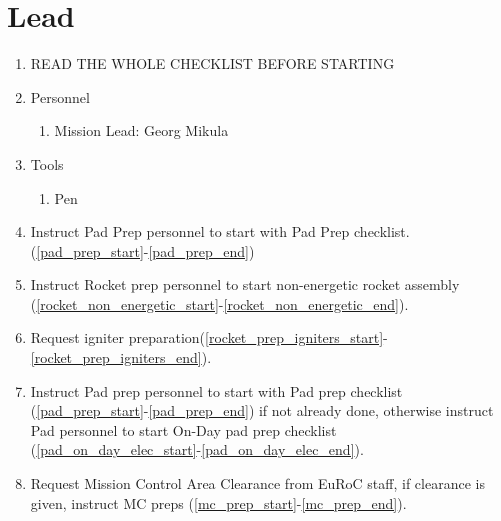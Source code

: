 \newpage
\setcounter{page}{1}
\lfoot{\thepage / \pageref{end_section_lead}}
\section*{Lead}



\begin{enumerate}[label=L\arabic*.]
    \item READ THE WHOLE CHECKLIST BEFORE STARTING \checkbox
    
    \item \label{lead_personnel} Personnel
        \begin{enumerate}[label*=\arabic*.]
            \item Mission Lead: Georg Mikula
        \end{enumerate}
    \item \label{lead_tools} Tools
        \begin{enumerate}[label*=\arabic*.]
            \item Pen\checkbox
        \end{enumerate}
    
    \item Instruct Pad Prep personnel to start with Pad Prep checklist. (\ref{pad_prep_start}-\ref{pad_prep_end})\checkbox
    \item Instruct Rocket prep personnel to start non-energetic rocket assembly (\ref{rocket_non_energetic_start}-\ref{rocket_non_energetic_end}).\checkbox
    
    \item Request igniter preparation(\ref{rocket_prep_igniters_start}-\ref{rocket_prep_igniters_end}).\checkbox
    \item Instruct Pad prep personnel to start with Pad prep checklist (\ref{pad_prep_start}-\ref{pad_prep_end}) if not already done, otherwise instruct Pad personnel to start On-Day pad prep checklist (\ref{pad_on_day_elec_start}-\ref{pad_on_day_elec_end}).\checkbox
    \item Request Mission Control Area Clearance from EuRoC staff, if clearance is given, instruct MC preps (\ref{mc_prep_start}-\ref{mc_prep_end}).\checkbox
    

\end{enumerate}
